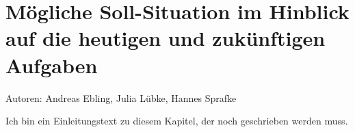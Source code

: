 \chapter{Mögliche Soll-Situation im Hinblick auf die heutigen und zukünftigen Aufgaben}

Autoren: Andreas Ebling, Julia Lübke, Hannes Sprafke 

Ich bin ein Einleitungstext zu diesem Kapitel, der noch geschrieben werden muss.




